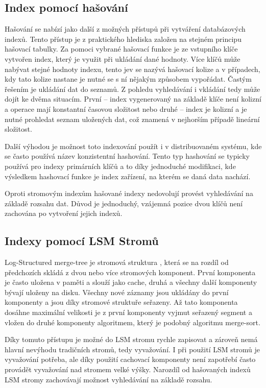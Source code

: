 \subsection{Index pomocí hašování}
Hašování se nabízí jako další z možných přístupů při vytváření databázových indexů. Tento přístup je z praktického hlediska založen na stejném principu hašovací tabulky. Za pomoci vybrané hašovací funkce je ze vstupního klíče vytvořen index, který je využit při ukládání dané hodnoty. Více klíčů může nabývat stejné hodnoty indexu, tento jev se nazývá hašovací kolize a v případech, kdy tato kolize nastane je nutné se s ní nějakým způsobem vypořádat. Častým řešením je ukládání dat do seznamů. Z pohledu vyhledávání i vkládání tedy může dojít ke dvěma situacím. První -- index vygenerovaný na základě klíče není kolizní a operace mají konstantní časovou složitost nebo druhé -- index je kolizní a je nutné prohledat seznam uložených dat, což znamená v nejhorším případě lineární složitost.

Další výhodou je možnost toto indexování použít i v distribuovaném systému, kde se často používá název konzistentní hashování. Tento typ hashování se typicky používá pro indexy primárních klíčů a to díky jednoduché modifikaci, kde výsledkem hashovací funkce je index zařízení, na kterém se daná data nachází.

Oproti stromovým indexům hašované indexy nedovolují provést vyhledávání na základě rozsahu dat. Důvod je jednoduchý, vzájemná pozice dvou klíčů není zachována po vytvoření jejich indexů.
\subsection{Indexy pomocí LSM Stromů}
Log-Structured merge-tree je stromová struktura \cite{stopford_2015}, která se na rozdíl od předchozích skládá z dvou nebo více stromových komponent. První komponenta je často uložena v paměti a slouží jako cache, druhá a všechny další komponenty bývají uloženy na disku. Všechny nové záznamy jsou ukládány do první komponenty a jsou díky stromové struktuře seřazeny. Až tato komponenta dosáhne maximální velikosti je z první komponenty vyjmut seřazený segment a vložen do druhé komponenty algoritmem, který je podobný algoritmu merge-sort. 

Díky tomuto přístupu je možné do LSM stromu rychle zapisovat a zároveň nemá hlavní nevýhodu tradičních stromů, tedy vyvažování. I při použití LSM stromů je vyvažování potřeba, ale díky použití cachovací komponenty není zapotřebí často provádět vyvažování nad stromem velké výšky. Narozdíl od hašovaných indexů LSM stromy zachovávají možnost vyhledávání na základě rozsahu.

